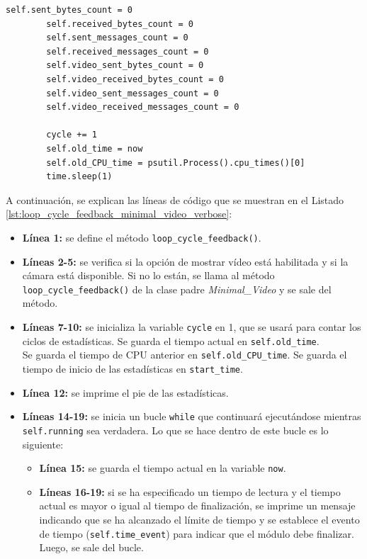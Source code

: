 \begin{lstlisting}[style=pythonstyle, caption={Método \texttt{loop\_cycle\_feedback()} de \textit{Minimal\_Video\_verbose}.}, label={lst:loop_cycle_feedback_minimal_video_verbose}]
        self.sent_bytes_count = 0
        self.received_bytes_count = 0
        self.sent_messages_count = 0
        self.received_messages_count = 0
        self.video_sent_bytes_count = 0
        self.video_received_bytes_count = 0
        self.video_sent_messages_count = 0
        self.video_received_messages_count = 0

        cycle += 1
        self.old_time = now
        self.old_CPU_time = psutil.Process().cpu_times()[0]
        time.sleep(1)
\end{lstlisting}
\vspace{\baselineskip}

A continuación, se explican las líneas de código que se muestran en el Listado \ref{lst:loop_cycle_feedback_minimal_video_verbose}:

\begin{itemize}
    \item \textbf{Línea 1:} se define el método \texttt{loop\_cycle\_feedback()}.
    \item \textbf{Líneas 2-5:} se verifica si la opción de mostrar vídeo está habilitada y si la cámara está disponible. Si no lo están, se llama al método \texttt{loop\_cycle\_feedback()} de la clase padre \textit{Minimal\_Video} y se sale del método.
    \item \textbf{Líneas 7-10:} se inicializa la variable \texttt{cycle} en 1, que se usará para contar los ciclos de estadísticas. Se guarda el tiempo actual en \texttt{self.old\_time}. \\
    Se guarda el tiempo de CPU anterior en \texttt{self.old\_CPU\_time}. Se guarda el tiempo de inicio de las estadísticas en \texttt{start\_time}.
    \item \textbf{Línea 12:} se imprime el pie de las estadísticas.
    \item \textbf{Líneas 14-19:} se inicia un bucle \texttt{while} que continuará ejecutándose mientras \texttt{self.running} sea verdadera. Lo que se hace dentro de este bucle es lo siguiente:
    \begin{itemize}
        \item \textbf{Línea 15:} se guarda el tiempo actual en la variable \texttt{now}.
        \item \textbf{Líneas 16-19:} si se ha especificado un tiempo de lectura y el tiempo actual es mayor o igual al tiempo de finalización, se imprime un mensaje indicando que se ha alcanzado el límite de tiempo y se establece el evento de tiempo (\texttt{self.time\_event}) para indicar que el módulo debe finalizar. Luego, se sale del bucle.

\end{itemize}
\end{itemize}
